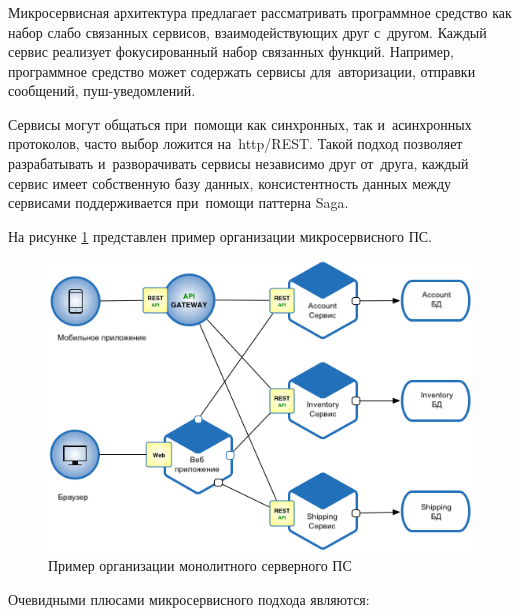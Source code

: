 \subsubsection {}
\label{sec:analysis:research:backArch:microservices}

Микросервисная архитектура предлагает рассматривать программное средство как набор слабо связанных сервисов, взаимодействующих друг с~другом. Каждый сервис реализует фокусированный набор связанных функций. Например, программное средство может содержать сервисы для~авторизации, отправки сообщений, пуш-уведомлений.

Сервисы могут общаться при~помощи как синхронных, так и~асинхронных протоколов, часто выбор ложится на~\gls{http}/REST. Такой подход позволяет разрабатывать и~разворачивать сервисы независимо друг от~друга, каждый сервис имеет собственную базу данных, консистентность данных между сервисами поддерживается при~помощи паттерна Saga\cite{microservices:ms}.

На рисунке \ref{sec:analysis:research:arch:back:micro} представлен пример организации микросервисного ПС.

\begin{figure}[h]
  \centering
    \includegraphics[width=1\textwidth]{inc/img/backend-micro.png}
  \caption{Пример организации монолитного серверного ПС}
  \label{sec:analysis:research:arch:back:micro}
\end{figure}

Очевидными плюсами микросервисного подхода являются:

